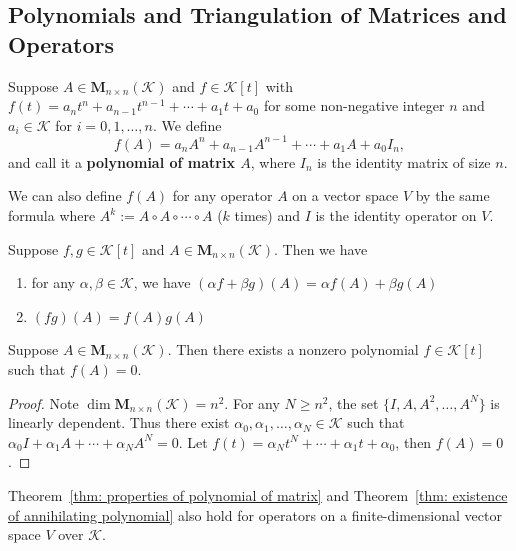 \documentclass{ctexart}
\newcommand{\M}{\mathbf{M}}
\begin{document}
    \subsection{Polynomials and Triangulation of Matrices and Operators}
    \begin{mydef}
        Suppose $A\in \M_{n\times n}(\mathcal{K})$ and $f\in \mathcal{K}[t]$ with $f(t) = a_n t^n + a_{n-1} t^{n-1} + \cdots + a_1 t + a_0$ for some non-negative integer $n$ and $a_i \in \mathcal K$ for $i=0,1,\ldots,n$. We define
        $$ f(A) = a_n A^n + a_{n-1} A^{n-1} + \cdots + a_1 A + a_0 I_n, $$
        and call it a \textbf{polynomial of matrix $A$}, where $I_n$ is the identity matrix of size $n$.
    \end{mydef}
    \begin{myrmk}
        We can also define $f(A)$ for any operator $A$ on a vector space $V$ by the same formula where $A^k := A \circ A \circ \cdots \circ A$ ($k$ times) and $I$ is the identity operator on $V$.
    \end{myrmk}
    \begin{mythm}\label{thm: properties of polynomial of matrix}
        Suppose $f,g\in \mathcal K[t]$ and $A\in \M_{n\times n}(\mathcal{K})$. Then we have
        \begin{enumerate}[label=(\arabic*)]
            \item for any $\alpha, \beta \in \mathcal K$, we have $(\alpha f + \beta g)(A) = \alpha f(A) + \beta g(A)$
            \item $(fg)(A) = f(A) g(A)$
        \end{enumerate}
    \end{mythm}
    \begin{mythm}\label{thm: existence of annihilating polynomial}
        Suppose $A\in \M_{n\times n}(\mathcal{K})$. Then there exists a nonzero polynomial $f\in \mathcal{K}[t]$ such that $f(A) = 0$. 
    \end{mythm}
    \begin{proof}
        Note $\dim \M_{n\times n}(\mathcal{K}) = n^2$. For any $N \ge n^2$, the set $\{ I, A, A^2, \ldots, A^N \}$ is linearly dependent. Thus there exist $\alpha_0, \alpha_1, \ldots, \alpha_N \in \mathcal K$ such that $\alpha_0 I + \alpha_1 A + \cdots + \alpha_N A^N = 0$. Let $f(t) = \alpha_N t^N + \cdots + \alpha_1 t + \alpha_0$, then $f(A) = 0$.
    \end{proof}
    \begin{myrmk}
        Theorem~\ref{thm: properties of polynomial of matrix} and Theorem~\ref{thm: existence of annihilating polynomial} also hold for operators on a finite-dimensional vector space $V$ over $\mathcal K$.
    \end{myrmk}
\end{document}
